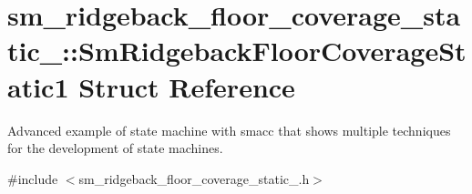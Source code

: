 \hypertarget{structsm__ridgeback__floor__coverage__static__1_1_1SmRidgebackFloorCoverageStatic1}{}\section{sm\+\_\+ridgeback\+\_\+floor\+\_\+coverage\+\_\+static\+\_\+:\+:Sm\+Ridgeback\+Floor\+Coverage\+Static1 Struct Reference}
\label{structsm__ridgeback__floor__coverage__static__1_1_1SmRidgebackFloorCoverageStatic1}


Advanced example of state machine with smacc that shows multiple techniques for the development of state machines.  




{\ttfamily \#include $<$sm\+\_\+ridgeback\+\_\+floor\+\_\+coverage\+\_\+static\+\_.\+h$>$}




